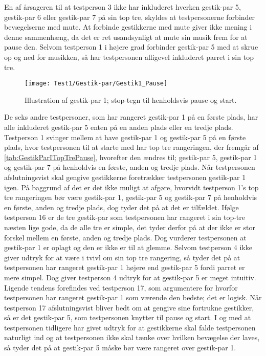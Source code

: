 En af årsageren til at testperson 3 ikke har inkluderet hverken gestik-par 5, gestik-par 6 eller gestik-par 7 på sin top tre, skyldes at testpersonerne forbinder bevægelserne med mute. At forbinde gestikkerne med mute giver ikke mening i denne sammenhæng, da det er ret usandsynligt at mute sin musik frem for at pause den. Selvom testperson 1 i højere grad forbinder gestik-par 5 med at skrue op og ned for musikken, så har testpersonen alligevel inkluderet parret i sin top tre.
%
\begin{figure}[H]
	\centering
	\texttt{[image: Test1/Gestik-par/Gestik1\_Pause]}
	\caption{Illustration af gestik-par 1; stop-tegn til henholdsvis pause og start.}
	\label{fig:GestikPar1Pause}
\end{figure}
\noindent
% 	 
De seks andre testpersoner, som har rangeret gestik-par 1 på en første plads, har alle inkluderet gestik-par 5 enten på en anden plads eller en tredje plads. Testperson 1 svinger mellem at have gestik-par 1 og gestik-par 5 på en første plads, hvor testpersonen til at starte med har top tre rangeringen, der fremgår af \autoref{tab:GestikParITopTrePause}, hvorefter den ændres til; gestik-par 5, gestik-par 1 og gestik-par 7 på henholdvis en første, anden og tredje plads. Når testpersonen afslutningsvist skal gengive gestikkerne foretrækker testpersonen gestik-par 1 igen. På baggrund af det er det ikke muligt at afgøre, hvorvidt testperson 1's top tre rangeringen bør være gestik-par 1, gestik-par 5 og gestik-par 7 på henholdvis en første, anden og tredje plads, dog tyder det på at det er tilfældet. Ifølge testperson 16 er de tre gestik-par som testpersonen har rangeret i sin top-tre næsten lige gode, da de alle tre er simple, det tyder derfor på at der ikke er stor forskel mellem en første, anden og tredje plads. Dog vurderer testpersonen at gestik-par 1 er oplagt og den er ikke er til at glemme. Selvom testperson 4 ikke giver udtryk for at være i tvivl om sin top tre rangering, så tyder det på at testpersonen har rangeret gestik-par 1 højere end gestik-par 5 fordi parret er mere simpel. Dog giver testperson 4 udtryk for at gestik-par 5 er meget intuitiv. Ligende tendens forefindes ved testperson 17, som argumentere for hvorfor testpersonen har rangeret gestik-par 1 som værende den bedste; det er logisk. Når testperson 17 afslutningsvist bliver bedt om at gengive sine fortrukne gestikker, så er det gestik-par 5, som testpersonen knytter til pause og start. I og med at testpersonen tidligere har givet udtryk for at gestikkerne skal falde testpersonen naturligt ind og at testpersonen ikke skal tænke over hvilken bevægelse der laves, så tyder det på at gestik-par 5 måske bør være rangeret over gestik-par 1.   

